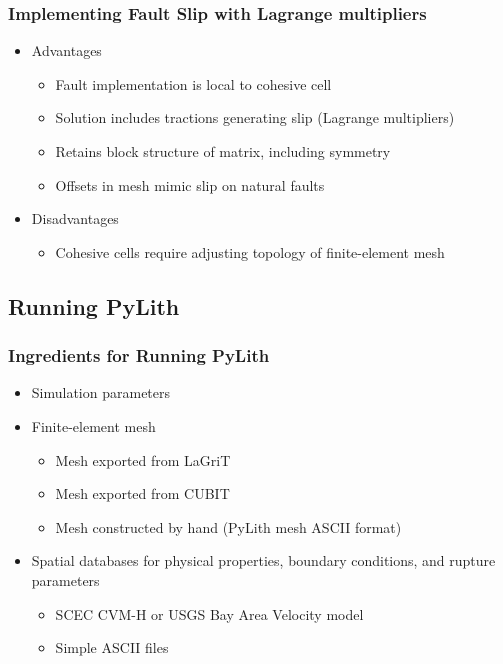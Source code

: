 \documentclass{beamer}
\begin{document}
\begin{frame}
  \frametitle{Implementing Fault Slip with Lagrange multipliers}
 
 \begin{itemize}
 \item Advantages
   \begin{itemize}
   \item Fault implementation is local to cohesive cell
   \item Solution includes tractions generating slip (Lagrange multipliers)
   \item Retains block structure of matrix, including symmetry
   \item Offsets in mesh mimic slip on natural faults
   \end{itemize}
 \item Disadvantages 
   \begin{itemize}
   \item Cohesive cells require adjusting topology of finite-element mesh
  \end{itemize}
 \end{itemize}
  
\end{frame}


\subsection{Running PyLith}

\begin{frame}
  \frametitle{Ingredients for Running PyLith}

  \begin{itemize}
  \item Simulation parameters
  \item Finite-element mesh
    \begin{itemize}
    \item Mesh exported from LaGriT
    \item Mesh exported from CUBIT
    \item Mesh constructed by hand (PyLith mesh ASCII format)
    \end{itemize}
  \item Spatial databases for physical properties, boundary
    conditions, and rupture parameters
    \begin{itemize}
    \item SCEC CVM-H or USGS Bay Area Velocity model
    \item Simple ASCII files
    \end{itemize}
  \end{itemize}

\end{frame}
\end{document}
